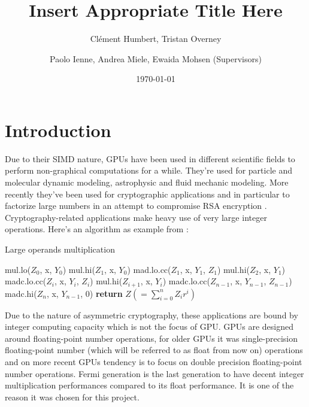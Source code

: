 \documentclass{report}
\begin{document}
\title{Insert Appropriate Title Here}
\author{Cl\'{e}ment Humbert, Tristan Overney\and Paolo Ienne, Andrea Miele, Ewaida Mohsen (Supervisors)}
\date{\today}
\maketitle

\nocite{*}

\setcounter{tocdepth}{1}
\tableofcontents
\listoffigures

\chapter{Introduction}

    Due to their SIMD nature, GPUs have been used in different scientific fields to perform
    non-graphical computations for a while. They're used for particle and molecular dynamic 
    modeling, astrophysic and fluid mechanic modeling.
    More recently they've been used for cryptographic applications and in particular
    to factorize large numbers in an attempt to compromise RSA encryption \cite{cofact14}.
    Cryptography-related applications make heavy use of very large integer operations.
    Here's an algorithm as example from \cite{cofact14}:
    \begin{algorithm}
    \caption{Large operands multiplication}\label{alg:mulalgo}
    \begin{algorithmic}[1]
        \State mul.lo($Z_0$, x, $Y_0$)
        \State mul.hi($Z_1$, x, $Y_0$)
        \State mad.lo.cc($Z_1$, x, $Y_1$, $Z_1$)
        \State mul.hi($Z_2$, x, $Y_1$)
            \State madc.lo.cc($Z_i$, x, $Y_i$, $Z_i$)
            \State mul.hi($Z_{i+1}$, x, $Y_i$)
        \EndFor
        \State madc.lo.cc($Z_{n-1}$, x, $Y_{n-1}$, $Z_{n-1}$)
        \State madc.hi($Z_n$, x, $Y_{n-1}$, 0)
        \State \textbf{return} $Z (=\sum_{i=0}^nZ_ir^i)$
    \end{algorithmic}
    \end{algorithm}

    Due to the nature of asymmetric cryptography, these applications are bound by
    integer computing capacity which is not the focus of GPU. GPUs are designed
    around floating-point number operations, for older GPUs it was single-precision
    floating-point number (which will be referred to as float from now on) operations and
    on more recent GPUs tendency is to focus on double precision floating-point number operations.
    Fermi generation is the last generation to have decent integer multiplication performances
    compared to its float performance. It is one of the reason it was chosen for this project.
\end{document}

